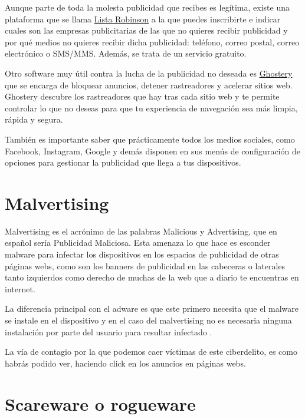 \documentclass[
  a4paper,
  openany]{book}
\begin{document}
Aunque parte de toda la molesta publicidad que recibes es legítima, existe una plataforma que se llama \href{https://www.listarobinson.es/}{Lista Robinson} a la que puedes inscribirte e indicar cuales son las empresas publicitarias de las que no quieres recibir publicidad y por qué medios no quieres recibir dicha publicidad: teléfono, correo postal, correo electrónico o SMS/MMS. Además, se trata de un servicio gratuito.

Otro software muy útil contra la lucha de la publicidad no deseada es \href{https://www.ghostery.com/}{Ghostery} que se encarga de bloquear anuncios, detener rastreadores y acelerar sitios web. Ghostery descubre los rastreadores que hay tras cada sitio web y te permite controlar lo que no deseas para que tu experiencia de navegación sea más limpia, rápida y segura.

También es importante saber que prácticamente todos los medios sociales, como Facebook, Instagram, Google y demás disponen en sus menús de configuración de opciones para gestionar la publicidad que llega a tus dispositivos.

\hypertarget{malvertising}{%
\section{Malvertising}\label{malvertising}}

Malvertising es el acrónimo de las palabras Malicious y Advertising, que en español sería Publicidad Maliciosa. Esta amenaza lo que hace es esconder malware para infectar los dispositivos en los espacios de publicidad de otras páginas webs, como son los banners de publicidad en las cabeceras o laterales tanto izquierdos como derecho de muchas de la web que a diario te encuentras en internet.

La diferencia principal con el adware es que este primero necesita que el malware se instale en el dispositivo y en el caso del malvertising no es necesaria ninguna instalación por parte del usuario para resultar infectado \citep{OSI-malvertising}.

La vía de contagio por la que podemos caer víctimas de este ciberdelito, es como habrás podido ver, haciendo click en los anuncios en páginas webs.

\hypertarget{scareware-o-rogueware}{%
\section{Scareware o rogueware}\label{scareware-o-rogueware}}
\end{document}
